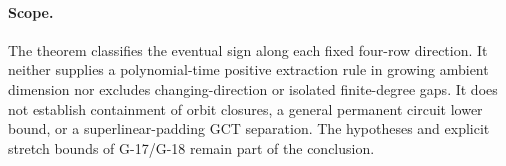 \paragraph{Scope.}
The theorem classifies the eventual sign along each fixed
four-row direction. It neither supplies a polynomial-time
positive extraction rule in growing ambient dimension nor
excludes changing-direction or isolated finite-degree gaps.
It does not establish containment of orbit closures, a general
permanent circuit lower bound, or a superlinear-padding GCT
separation. The hypotheses and explicit stretch bounds of
G-17/G-18 remain part of the conclusion.
